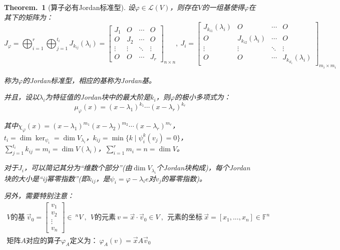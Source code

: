 \documentclass[zihao=5,UTF8]{report}
\theoremstyle{mystyle} %
\newtheorem{theorem}{Theorem.\,}
\begin{document}
\begin{theorem}[算子必有Jordan标准型]\label{算子必有Jordan标准型}
设$\varphi \in \mathscr{L}(V)$，则存在$V$的一组基使得$\varphi$在其下的矩阵为：
\begin{equation*}
    J_{\varphi} = \bigoplus_{i=1}^{r}\bigoplus_{j=1}^{t_i} J_{k_{ij}}(\lambda_i)= 
    \begin{bmatrix}  
        J_1& O& \cdots  & O \\  
        O& J_2& \cdots  & O \\  
        \vdots & \vdots & \ddots & \vdots \\  
        O& O& \cdots  & J_r  
    \end{bmatrix}_{n \times n},\ 
    J_i = 
    \begin{bmatrix}
        J_{k_{i1}}(\lambda_i)& O& \cdots  & O \\  
        O& J_{k_{i2}}(\lambda_i)& \cdots  & O \\  
        \vdots & \vdots & \ddots & \vdots \\  
        O& O& \cdots  & J_{k_{it_i}}(\lambda_i)
    \end{bmatrix}_{m_i \times m_i}
\end{equation*}
{\color{gray}\small 称为$\varphi$的Jordan标准型，相应的基称为Jordan基。\par}
并且，设以$\lambda_i$为特征值的Jordan块中的最大阶是$k_i$，则$\varphi$的极小多项式为：
\begin{equation*}
    \mu_{\varphi}(x) =  (x-\lambda_1)^{k_1}\cdots (x-\lambda_r)^{k_r}
\end{equation*}
{\color{gray}\small 其中$\chi_{\varphi}(x) = (x-\lambda_1)^{m_1}(x-\lambda_2)^{m_2} \cdots (x-\lambda_r)^{m_r}$，$t_i = \dim \ker_{\psi_i} = \dim V_{\lambda_i}$，$k_{ij}= \min \{k\mid \psi_i^k(v_j) = 0 \}$，$\sum_{j=1}^{t_i} k_{ij} = m_i = \dim V(\lambda_i)$，$\sum_{i=1}^{r}m_i = n = \dim V$。\par}
{\color{gray}\small 对于$J_i$，可以简记其分为“维数个部分”(由$\dim V_{\lambda_i}$个Jordan块构成)，每个Jordan块的大小是“ij幂零指数”(即$k_{ij}$，是$\psi_i = \varphi - \lambda_i e$对$v_j$的幂零指数)。\par
{\color{red}
另外，需要特别注意：
\begin{gather*}
    \text{$V$的基}\ \vec{v}_0 = 
    \begin{bmatrix}
        v_1\\
        v_2\\
        \vdots\\
        v_n
    \end{bmatrix} \in\ {^nV}\ ,\ \ 
    \text{$V$的元素}\ v = \vec{x}\cdot \vec{v}_0 \in V \ ,\ \ 
    \text{元素的坐标}\ \vec{x} = \left[x_1,...,x_n\right]\in \mathbb{F}^n\\
    \text{矩阵$A$对应的算子$\varphi_{A}$定义为：}\ \varphi_A(v) = \vec{x}A\vec{v}_0 
\end{gather*}}}


\end{theorem}
\end{document}
